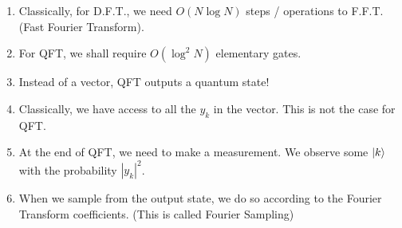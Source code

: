 \documentclass[11.5pt, paper=a4]{article}
\theoremstyle{definition}
\numberwithin{theorem}{section}
\begin{document}
\begin{enumerate}
    \item Classically, for D.F.T., we need $O(N \log{N})$ steps / operations to F.F.T. (Fast Fourier Transform).
    \item For QFT, we shall require $O(\log^2{N})$ elementary gates.
    \item Instead of a vector, QFT outputs a quantum state!
    \item Classically, we have access to all the $y_k$ in the vector. This is not the case for QFT.
    \item At the end of QFT, we need to make a measurement. We observe some $\ket{k}$ with the probability $|y_k|^2$.
    \item When we sample from the output state, we do so according to the Fourier Transform coefficients. (This is called Fourier Sampling)
\end{enumerate}





\nocite{*}

\end{document}
